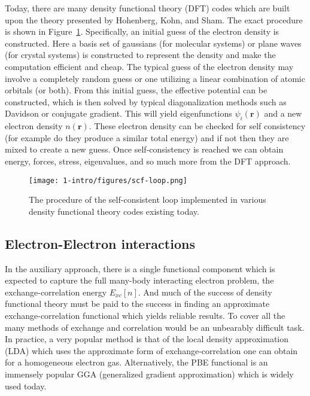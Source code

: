 Today, there are many density functional theory (DFT) codes which are built upon the theory presented by Hohenberg, Kohn, and Sham. The exact procedure is shown in Figure~\ref{intro:fig:scf}. Specifically, an initial guess of the electron density is constructed. Here a basis set of gaussians (for molecular systems) or plane waves (for crystal systems) is constructed to represent the density and make the computation efficient and cheap. The typical guess of the electron density may involve a completely random guess or one utilizing a linear combination of atomic orbitals (or both). From this initial guess, the effective potential can be constructed, which is then solved by typical diagonalization methods such as Davidson or conjugate gradient. This will yield eigenfunctions $\psi_i(\textbf{r})$ and a new electron density $n(\textbf{r})$. These electron density can be checked for self consistency (for example do they produce a similar total energy) and if not then they are mixed to create a new guess. Once self-consistency is reached we can obtain energy, forces, stress, eigenvalues, and so much more from the DFT approach.

\begin{figure}[h]
\begin{center}
\texttt{[image: 1-intro/figures/scf-loop.png]}
    \caption{The procedure of the self-consistent loop implemented in various density functional theory codes existing today.}  \label{intro:fig:scf}
\end{center}
\end{figure}


\subsection{Electron-Electron interactions}

In the auxiliary approach, there is a single functional component which is expected to capture the full many-body interacting electron problem, the exchange-correlation energy $E_{xc}[n]$. And much of the success of density functional theory must be paid to the success in finding an approximate exchange-correlation functional which yields reliable results.
To cover all the many methods of exchange and correlation would be an unbearably difficult task. In practice, a very popular method is that of the local density approximation (LDA) which uses the approximate form of exchange-correlation one can obtain for a homogeneous electron gas. Alternatively, the PBE functional is an immensely popular GGA (generalized gradient approximation) which is widely used today.~\cite{perdew1996generalized}

